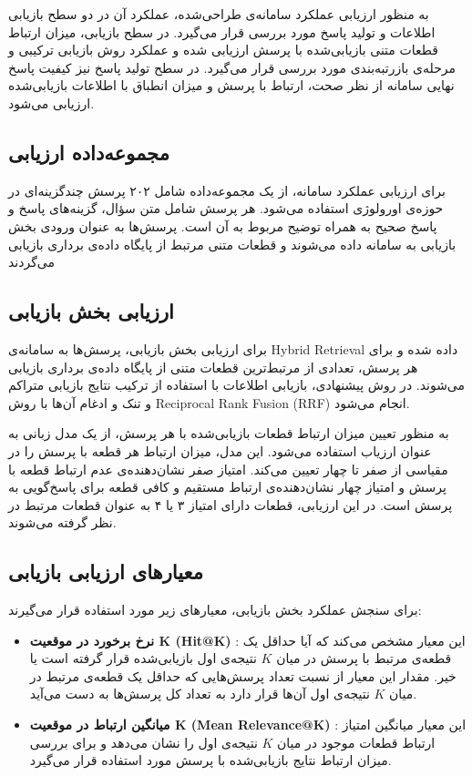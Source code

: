 به منظور ارزیابی عملکرد سامانه‌ی طراحی‌شده، عملکرد آن در دو سطح
بازیابی اطلاعات و تولید پاسخ مورد بررسی قرار می‌گیرد. در سطح
بازیابی، میزان ارتباط قطعات متنی بازیابی‌شده با پرسش ارزیابی شده
و عملکرد روش بازیابی ترکیبی و مرحله‌ی بازرتبه‌بندی مورد بررسی قرار
می‌گیرد. در سطح تولید پاسخ نیز کیفیت پاسخ نهایی سامانه از نظر
صحت، ارتباط با پرسش و میزان انطباق با اطلاعات بازیابی‌شده ارزیابی
می‌شود.

\subsection{مجموعه‌داده ارزیابی}


برای ارزیابی عملکرد سامانه، از یک مجموعه‌داده شامل ۲۰۲ پرسش
چندگزینه‌ای در حوزه‌ی اورولوژی استفاده می‌شود. هر پرسش شامل متن
سؤال، گزینه‌های پاسخ و پاسخ صحیح به همراه توضیح مربوط به آن است.
پرسش‌ها به عنوان ورودی بخش بازیابی به سامانه داده می‌شوند و قطعات متنی
مرتبط از پایگاه داده‌ی برداری بازیابی می‌گردند

\subsection{ارزیابی بخش بازیابی}


برای ارزیابی بخش بازیابی، پرسش‌ها به سامانه‌ی Hybrid Retrieval
داده شده و برای هر پرسش، تعدادی از مرتبط‌ترین قطعات متنی از
پایگاه داده‌ی برداری بازیابی می‌شوند. در روش پیشنهادی، بازیابی
اطلاعات با استفاده از ترکیب نتایج بازیابی متراکم و تنک و ادغام
آن‌ها با روش Reciprocal Rank Fusion (RRF) انجام می‌شود.

به منظور تعیین میزان ارتباط قطعات بازیابی‌شده با هر پرسش، از یک
مدل زبانی به عنوان ارزیاب استفاده می‌شود. این مدل، میزان ارتباط
هر قطعه با پرسش را در مقیاسی از صفر تا چهار تعیین می‌کند. امتیاز
صفر نشان‌دهنده‌ی عدم ارتباط قطعه با پرسش و امتیاز چهار نشان‌دهنده‌ی
ارتباط مستقیم و کافی قطعه برای پاسخ‌گویی به پرسش است. در این
ارزیابی، قطعات دارای امتیاز ۳ یا ۴ به عنوان قطعات مرتبط در نظر
گرفته می‌شوند.

\subsection{معیارهای ارزیابی بازیابی}


برای سنجش عملکرد بخش بازیابی، معیارهای زیر مورد استفاده قرار
می‌گیرند:


\begin{itemize}

\item \textbf{نرخ برخورد در موقعیت K (Hit@K)}
:
این معیار مشخص می‌کند که آیا حداقل یک قطعه‌ی مرتبط با پرسش در میان
$K$ نتیجه‌ی اول بازیابی‌شده قرار گرفته است یا خیر. مقدار این معیار
از نسبت تعداد پرسش‌هایی که حداقل یک قطعه‌ی مرتبط در میان $K$ نتیجه‌ی
اول آن‌ها قرار دارد به تعداد کل پرسش‌ها به دست می‌آید.

\item \textbf{میانگین ارتباط در موقعیت K (Mean Relevance@K)}
:
این معیار میانگین امتیاز ارتباط قطعات موجود در میان $K$ نتیجه‌ی
اول را نشان می‌دهد و برای بررسی میزان ارتباط نتایج بازیابی‌شده
با پرسش مورد استفاده قرار می‌گیرد.

\end{itemize}


